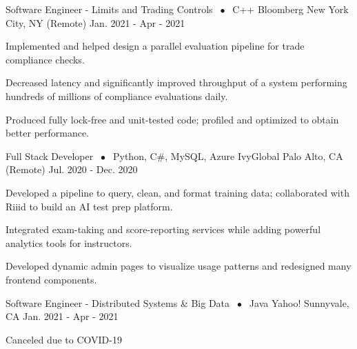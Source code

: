 

\begin{cventries}

  \cventry
    {Software Engineer - Limits and Trading Controls $\;\bullet\;$ C++} %
    {Bloomberg} %
    {New York City, NY (Remote)} %
    {Jan. 2021 - Apr - 2021} %
    {
      \begin{cvitems} %
      \item {Implemented and helped design a parallel evaluation pipeline for trade compliance checks.}
      \item {Decreased latency and significantly improved throughput of a system performing hundreds of millions of compliance evaluations daily.}
      \item {Produced fully lock-free and unit-tested code; profiled and optimized to obtain better performance.}
      \end{cvitems}
    }

  \cventry
    {Full Stack Developer $\;\bullet\;$ Python, C\#, MySQL, Azure} %
    {IvyGlobal} %
    {Palo Alto, CA (Remote)} %
    {Jul. 2020 - Dec. 2020} %
    {
      \begin{cvitems} %
      \item {Developed a pipeline to query, clean, and format training data; collaborated with Riiid to build an AI test prep platform.}
      \item {Integrated exam-taking and score-reporting services while adding powerful analytics tools for instructors.}
      \item {Developed dynamic admin pages to visualize usage patterns and redesigned many frontend components.}
      \end{cvitems}
    }

  \cventry
    {Software Engineer - Distributed Systems \& Big Data $\;\bullet\;$ Java} %
    {Yahoo!} %
    {Sunnyvale, CA} %
    {Jan. 2021 - Apr - 2021} %
    {
      \begin{cvitems} %
        \item {Canceled due to COVID-19}
      \end{cvitems}
    }


\end{cventries}
